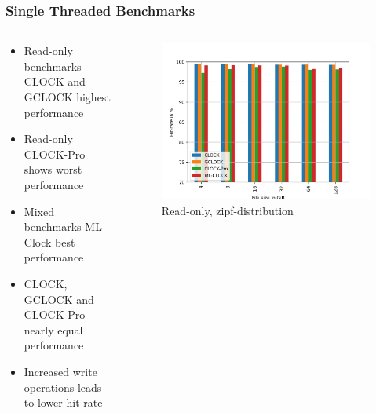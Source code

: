 \documentclass[
	aspectratio=169,
	compress,
]{beamer}
\newcommand{\navframetitle}[1]{\frametitle{#1\hfill{\footnotesize\lastsection{}}}}
\begin{document}
\begin{frame}[fragile]
	\navframetitle{Single Threaded Benchmarks}
	
	\begin{columns}
		\begin{column}{0.5\textwidth}
			\begin{itemize}
				\item Read-only benchmarks CLOCK and GCLOCK highest performance
				\item Read-only CLOCK-Pro shows worst performance
				\item Mixed benchmarks ML-Clock best performance
				\item CLOCK, GCLOCK and CLOCK-Pro nearly equal performance
				\item Increased write operations leads to lower hit rate
			\end{itemize}
		\end{column}
		\begin{column}{0.5\textwidth}
			\begin{figure}[ht]
    			\centering
    			\includegraphics[width=\textwidth]{randread_zipf.jpg}
        		\caption{Read-only, zipf-distribution}
        		\label{fig:single randread zipf}
			\end{figure}			
		\end{column}
	\end{columns}
\end{frame}
\end{document}
